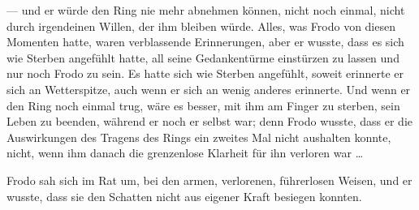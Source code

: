 — und er würde den Ring nie mehr abnehmen können, nicht noch einmal, nicht durch irgendeinen Willen, der ihm bleiben würde. Alles, was Frodo von diesen Momenten hatte, waren verblassende Erinnerungen, aber er wusste, dass es sich wie Sterben angefühlt hatte, all seine Gedankentürme einstürzen zu lassen und nur noch Frodo zu sein. Es hatte sich wie Sterben angefühlt, soweit erinnerte er sich an Wetterspitze, auch wenn er sich an wenig anderes erinnerte. Und wenn er den Ring noch einmal trug, wäre es besser, mit ihm am Finger zu sterben, sein Leben zu beenden, während er noch er selbst war; denn Frodo wusste, dass er die Auswirkungen des Tragens des Rings ein zweites Mal nicht aushalten konnte, nicht, wenn ihm danach die grenzenlose Klarheit für ihn verloren war …

Frodo sah sich im Rat um, bei den armen, verlorenen, führerlosen Weisen, und er wusste, dass sie den Schatten nicht aus eigener Kraft besiegen konnten.

